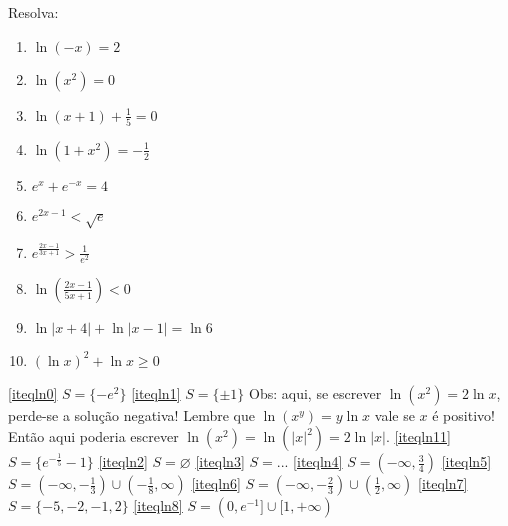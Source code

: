 \begin{exo}
Resolva:
\begin{multicols}{2}
 \begin{enumerate}
  \item\label{iteqln0} $\ln (-x)=2$
  \item\label{iteqln1} $\ln (x^2)=0$
  \item\label{iteqln11} $\ln (x+1)+\tfrac{1}{5}=0$
  \item\label{iteqln2} $\ln (1+x^2)=-\tfrac12$
  \item\label{iteqln3} $e^{x}+e^{-x}=4$
\item\label{iteqln4}$e^{2x-1}<\sqrt{e}$
\item\label{iteqln5}$e^{\tfrac{2x-1}{3x+1}}>\tfrac{1}{e^2}$
\item\label{iteqln6}$\ln(\frac{2x-1}{5x+1})<0$
\item\label{iteqln7} $\ln |x+4|+\ln |x-1|=\ln 6$
\item\label{iteqln8} $(\ln x)^2+\ln x\geq 0$
 \end{enumerate}
\end{multicols}
\vspace{0.01cm}
\begin{sol}
\eqref{iteqln0} $S=\{-e^2\}$
\eqref{iteqln1} $S=\{\pm 1\}$ Obs: aqui, se escrever $\ln(x^2)=2\ln x$, perde-se
a solução negativa! Lembre que $\ln (x^y)=y\ln x$ vale se $x$ é positivo! Então
aqui poderia escrever $\ln(x^2)=\ln (|x|^2)=2\ln |x|$.
\eqref{iteqln11} $S=\{e^{-\tfrac15}-1\}$
\eqref{iteqln2} $S=\varnothing$
\eqref{iteqln3} $S=...$
\eqref{iteqln4} $S=(-\infty,\tfrac34)$
\eqref{iteqln5} $S=(-\infty,-\tfrac13)\cup (-\tfrac18,\infty)$
\eqref{iteqln6} $S=(-\infty,-\tfrac23)\cup (\tfrac12,\infty)$
\eqref{iteqln7} $S=\{-5,-2,-1,2\}$
\eqref{iteqln8} $S=(0,e^{-1}]\cup [1,+\infty)$
\end{sol}
\end{exo}

